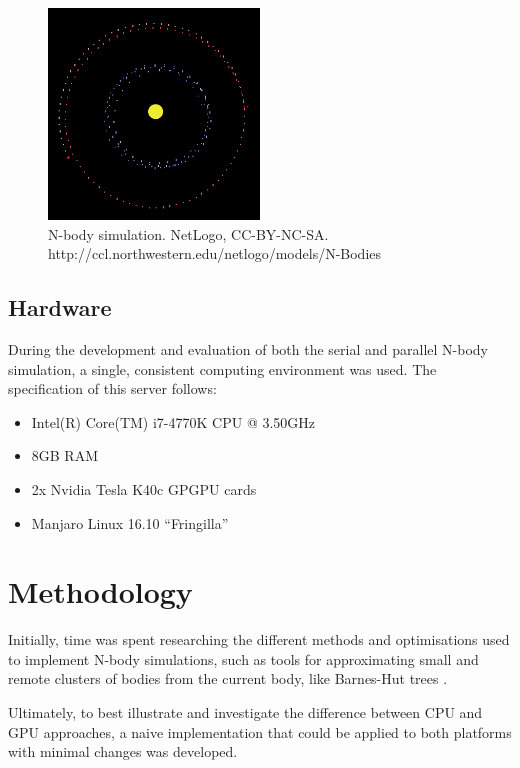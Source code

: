 \documentclass[journal,transmag]{IEEEtran}
\begin{document}
        \begin{figure}[h]
            \centering
            \includegraphics[width=0.5\textwidth]{report/images/nbody.png}
            \caption{N-body simulation. NetLogo, CC-BY-NC-SA. http://ccl.northwestern.edu/netlogo/models/N-Bodies}
        \end{figure}

        \subsection{Hardware}
        During the development and evaluation of both the serial and parallel N-body simulation, a single, consistent
        computing environment was used. The specification of this server follows:

        \begin{itemize}
            \item Intel(R) Core(TM) i7-4770K CPU @ 3.50GHz
            \item 8GB RAM
            \item 2x Nvidia Tesla K40c GPGPU cards
            \item Manjaro Linux 16.10 ``Fringilla''
        \end{itemize}

    \section{Methodology}
    Initially, time was spent researching the different methods and optimisations used to implement N-body simulations,
    such as tools for approximating small and remote clusters of bodies from the current body, like Barnes-Hut trees
    \cite{BarnesHut}.

    Ultimately, to best illustrate and investigate the difference between CPU and GPU approaches, a naive
    implementation that could be applied to both platforms with minimal changes was developed.
\end{document}
